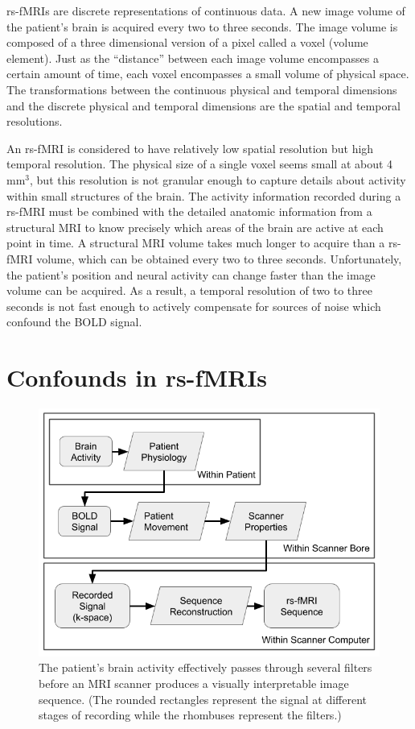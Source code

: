 rs-fMRIs are discrete representations of continuous data. A new image volume of the patient's brain is acquired every two to three seconds. The image volume is composed of a three dimensional version of a pixel called a voxel (volume element). Just as the ``distance'' between each image volume encompasses a certain amount of time, each voxel encompasses a small volume of physical space. The transformations between the continuous physical and temporal dimensions and the discrete physical and temporal dimensions are the spatial and temporal resolutions. 

An rs-fMRI is considered to have relatively low spatial resolution but high temporal resolution. The physical size of a single voxel seems small at about 4 mm$^3$, but this resolution is not granular enough to capture details about activity within small structures of the brain. The activity information recorded during a rs-fMRI must be combined with the detailed anatomic information from a structural MRI to know precisely which areas of the brain are active at each point in time. A structural MRI volume takes much longer to acquire than a rs-fMRI volume, which can be obtained every two to three seconds. Unfortunately, the patient's position and neural activity can change faster than the image volume can be acquired. As a result, a temporal resolution of two to three seconds is not fast enough to actively compensate for sources of noise which confound the BOLD signal. 

\section{Confounds in rs-fMRIs}

\begin{figure}
\centering
\includegraphics[width=.6\textwidth]{2/rsfMRI-signal-filters.png}
\caption{The patient's brain activity effectively passes through several filters before an MRI scanner produces a visually interpretable image sequence. (The rounded rectangles represent the signal at different stages of recording while the rhombuses represent the filters.)}
\label{ch2:fig:signal-filters}
\end{figure}

